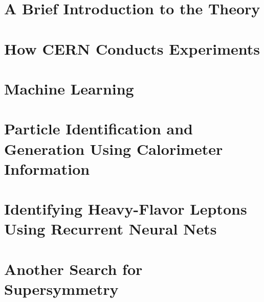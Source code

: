 \documentclass[draftthesis,fancy,edeposit]{uiuc_thesis_template}
\begin{document}


\part{A Brief Introduction to the Theory}




\part{How CERN Conducts Experiments}




\part{Machine Learning}



\part{Particle Identification and Generation Using Calorimeter Information}


\part{Identifying  Heavy-Flavor  Leptons  Using  Recurrent  Neural Nets}


\part{Another Search for Supersymmetry}


\appendix
%

\backmatter

\printbibliography
\end{document}
